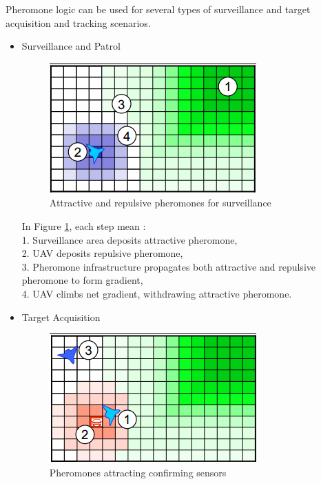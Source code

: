 Pheromone logic  can  be  used  for  several  types  of  surveillance  and target  acquisition  and  tracking scenarios.\\

\begin{itemize}
\item Surveillance and Patrol

\begin{figure}[h]
\center
\includegraphics[scale=0.7]{../images/pheromone_surveillance.png}
\caption{\label{surveillance}Attractive and repulsive pheromones for surveillance}
\end{figure}

In Figure \ref{surveillance}, each step mean :\\
 1. Surveillance area deposits attractive pheromone,\\
 2. UAV deposits repulsive pheromone,\\ 
 3. Pheromone infrastructure propagates both attractive and repulsive pheromone to form gradient,\\
 4. UAV climbs net gradient, withdrawing attractive pheromone.
 
\item Target Acquisition

\begin{figure}[h]
\center
\includegraphics[scale=0.7]{../images/pheromone_target_acquisition.png}
\caption{\label{targetacquisition}Pheromones attracting confirming sensors}
\end{figure}


\end{itemize}
